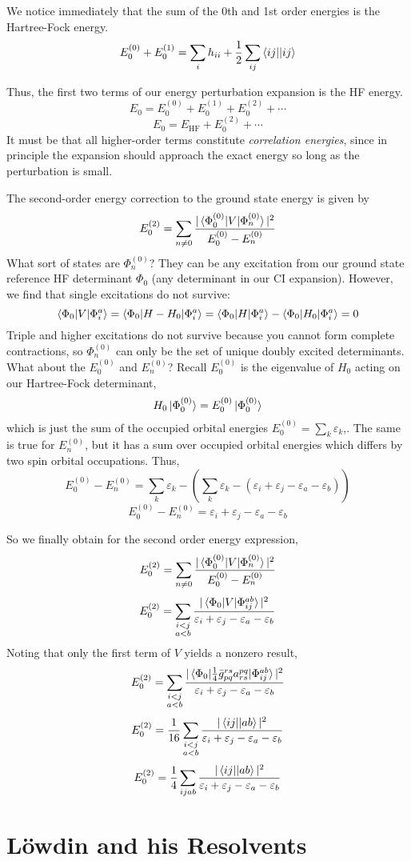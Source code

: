 \documentclass{article}
\newcommand{\eps}{\varepsilon}
\newcommand{\Ezero}{E^{(0)}}
\newcommand{\Phizero}{\Phi^{(0)}}
\begin{document}
We notice immediately that the sum of the 0th and 1st order energies is the Hartree-Fock energy.
\[ E_0^{(0)} + E_0^{(1)} = \sum_i h_{ii} + \frac{1}{2}\sum_{ij} \braket{ij||ij}   \] 

Thus, the first two terms of our energy perturbation expansion is the HF energy.
\[E_0 =  E_0^{(0)} +  E_0^{(1)} + E_0^{(2)} + \cdots \]
\[E_0 =  E_{\mathrm{HF}} + E_0^{(2)} + \cdots \]
It must be that all higher-order terms constitute \textit{correlation energies}, since in principle the expansion should approach the exact 
    energy so long as the perturbation is small.

The second-order energy correction to the ground state energy is given by 
\[ E_0^{(2)} = \sum_{n \neq 0} \frac{ |\braket{ \Phizero_0 | V | \Phizero_n} |^2  }{ \Ezero_0 - \Ezero_n}  \]
What sort of states are $\Phizero_n$? They can be any excitation from our ground state reference HF determinant $\Phi_0$ (any determinant in our CI expansion).
However, we find that single excitations do not survive:
\[ \braket{\Phi_0 | V | \Phi_i^a } =  \braket{\Phi_0 | H - H_0 | \Phi_i^a } = \braket{\Phi_0 | H | \Phi_i^a } - \braket{\Phi_0 | H_0 | \Phi_i^a }  = 0 \]
Triple and higher excitations do not survive because you cannot form complete contractions, so $\Phizero_n$ can only be the set of unique doubly excited determinants. 
What about the $\Ezero_0$ and $\Ezero_n $?
Recall $\Ezero_0$ is the eigenvalue of $H_0$ acting on our Hartree-Fock determinant,
\[H_0 \ket{\Phi_0^{(0)}} = E_0^{(0)} \ket{\Phi_0^{(0)}} \]
 which is just the sum of the occupied orbital energies $E_0^{(0)} = \sum_k \eps_k$,.
The same is true for $\Ezero_n$, but it has a sum over occupied orbital energies which differs by two spin orbital occupations. Thus,
\[\Ezero_0 - \Ezero_n =  \sum_k \eps_k - ( \sum_k \eps_k - (\eps_i + \eps_j - \eps_a - \eps_b)) \]
\[\Ezero_0 - \Ezero_n =  \eps_i + \eps_j - \eps_a - \eps_b \]

So we finally obtain for the second order energy expression,
\[ E_0^{(2)} = \sum_{n \neq 0} \frac{ |\braket{ \Phizero_0 | V | \Phizero_n} |^2  }{ \Ezero_0 - \Ezero_n}  \]
\[ E_0^{(2)} = \sum_{\substack{i < j \\ a < b}} \frac{ |\braket{ \Phi_0 | V | \Phi_{ij}^{ab}} |^2}{ \eps_i + \eps_j - \eps_a - \eps_b  }  \]
Noting that only the first term of $V$ yields a nonzero result,
\[ E_0^{(2)} = \sum_{\substack{i < j \\ a < b}} \frac{ |\braket{ \Phi_0 | \frac{1}{4} \bar{g}_{pq}^{rs} a_{rs}^{pq} | \Phi_{ij}^{ab}} |^2}{ \eps_i + \eps_j - \eps_a - \eps_b  }  \]
\[ E_0^{(2)} = \frac{1}{16} \sum_{\substack{i < j \\ a < b}}  \frac{ |\braket{ ij || ab}|^2}{ \eps_i + \eps_j - \eps_a - \eps_b}\]
\[ E_0^{(2)} = \frac{1}{4} \sum_{ijab} \frac{ |\braket{ ij || ab}|^2}{ \eps_i + \eps_j - \eps_a - \eps_b}\]



\section{L{\"o}wdin and his Resolvents}
 
\end{document}
